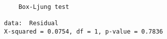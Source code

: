 \begin{verbatim} 

	Box-Ljung test

data:  Residual
X-squared = 0.0754, df = 1, p-value = 0.7836

\end{verbatim}